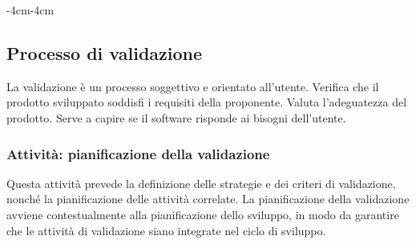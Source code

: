 \documentclass[a4paper,12pt]{article}
\begin{document}
\begin{table}[H]
    \begin{adjustwidth}{-4cm}{-4cm}
        \centering
    \end{adjustwidth}
\end{table}

\subsection{Processo di validazione}
La validazione è un processo soggettivo e orientato all'utente. Verifica che il prodotto sviluppato
soddisfi i requisiti della proponente. Valuta l'adeguatezza del prodotto. Serve a capire
se il software risponde ai bisogni dell'utente.

\subsubsection{Attività: pianificazione della validazione}
Questa attività prevede la definizione delle strategie e dei criteri di
validazione, nonché la pianificazione delle attività correlate. La
pianificazione della validazione avviene contestualmente alla pianificazione
dello sviluppo, in modo da garantire che le attività di validazione siano
integrate nel ciclo di sviluppo.
\end{document}
